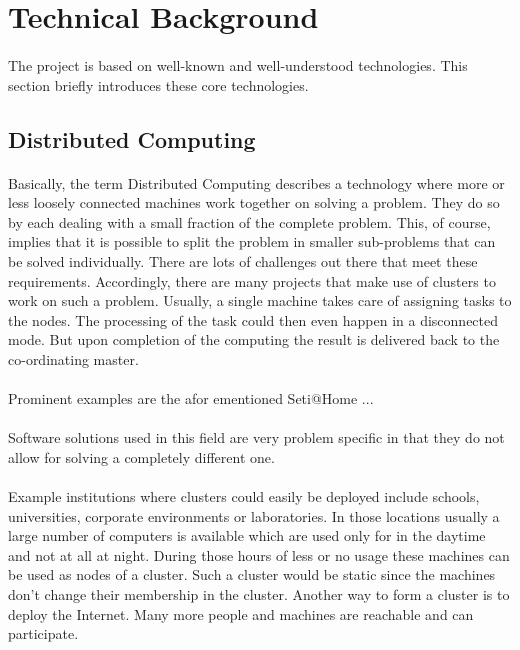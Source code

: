 \section{Technical Background}%
\paragraph{}
The project is based on well-known and well-understood technologies. This section briefly introduces these core technologies.

\subsection{Distributed Computing}
\paragraph{}
Basically, the term Distributed Computing describes a technology where more or less loosely connected machines work together on solving a problem. They do so by each dealing with a small fraction of the complete problem. This, of course, implies that it is possible to split the problem in smaller sub-problems that can be solved individually. There are lots of challenges out there that meet these requirements. Accordingly, there are many projects that make use of clusters to work on such a problem. Usually, a single machine takes care of assigning tasks to the nodes. The processing of the task could then even happen in a disconnected mode. But upon completion of the computing the result is delivered back to the co-ordinating master.
\paragraph{}
Prominent examples are the afor ementioned Seti@Home ...

\paragraph{}
Software solutions used in this field are very problem specific in that they do not allow for solving a completely different one. 

\paragraph{}
Example institutions where clusters could easily be deployed include schools, universities, corporate environments or laboratories. In those locations usually a large number of computers is available which are used only for in the daytime and not at all at night. During those hours of less or no usage these machines can be used as nodes of a cluster. Such a cluster would be static since the machines don't change their membership in the cluster. Another way to form a cluster is to deploy the Internet. Many more people and machines are reachable and can participate.

